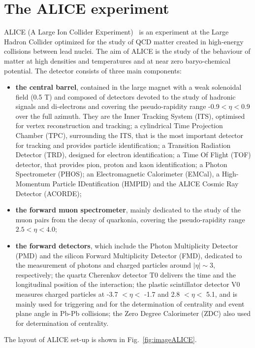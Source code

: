 \section{The ALICE experiment}
ALICE (A Large Ion Collider Experiment)~\cite{Abelev:2014ffa} is an experiment 
at the Large Hadron Collider optimized for the study of QCD matter
created in high-energy collisions between lead nuclei.
The aim of ALICE is the study of the behaviour of matter at high densities and temperatures 
and at near zero baryo-chemical potential. The detector consists of three main components: 
\begin{itemize}
\item \textbf{the central barrel}, contained in the large magnet with a weak solenoidal 
field (0.5 T) and composed of detectors devoted to the study of hadronic signals 
and di-electrons and covering the pseudo-rapidity range -0.9$< \eta <$0.9 over the 
full azimuth. They are the Inner Tracking System (ITS), optimised for vertex 
reconstruction and tracking; a cylindrical Time Projection Chamber (TPC),
 surrounding the ITS, that is the most important detector for tracking and provides particle identification; a 
 Transition Radiation Detector (TRD), designed for electron identification; 
 a Time Of Flight (TOF) detector, that provides pion, proton and kaon 
 identification; a Photon Spectrometer (PHOS); an Electromagnetic 
 Calorimeter (EMCal), a High-Momentum Particle IDentification (HMPID) 
 and the ALICE Cosmic Ray Detector (ACORDE);
\item \textbf{the forward muon spectrometer}, mainly dedicated to the study of 
the muon pairs from the decay of quarkonia, covering the pseudo-rapidity range $2.5< \eta < 4.0$;
\item \textbf{the forward detectors}, which include the Photon Multiplicity Detector 
(PMD) and the silicon Forward Multiplicity Detector (FMD), dedicated to the 
measurement of photons and charged particles around $|\eta| \sim 3$, respectively; 
the quartz Cherenkov detector T0 delivers the time and the longitudinal
 position of the interaction; the plastic scintillator detector V0 measures 
 charged particles at -3.7 $< \eta <$ -1.7 and 2.8 $< \eta <$ 5.1, and is mainly used
  for triggering and for the determination of centrality and event plane angle in 
  Pb-Pb collisions; the Zero Degree Calorimeter (ZDC) also used for determination of centrality.
\end{itemize}
The layout of ALICE set-up is shown in Fig.~\ref{fig:imageALICE}. 
